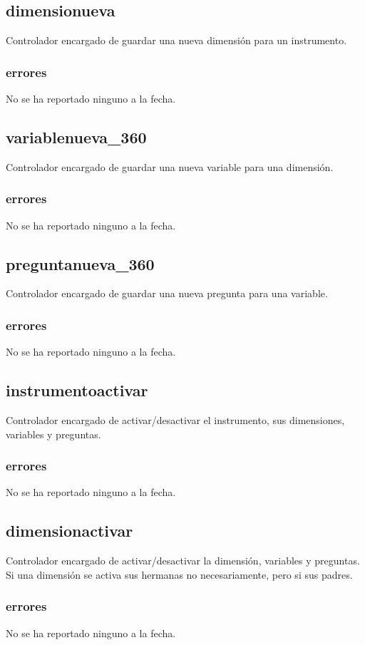 \documentclass[10pt,a4paper]{book}
\begin{document}
	\subsection{dimensionueva}
	Controlador encargado de guardar una nueva dimensión para un instrumento. 
	\subsubsection{errores}
	No se ha reportado ninguno a la fecha.
	
	\subsection{variablenueva\_360}
	Controlador encargado de guardar una nueva variable para una dimensión.
	\subsubsection{errores}
	No se ha reportado ninguno a la fecha.
	
	\subsection{preguntanueva\_360}
	Controlador encargado de guardar una nueva pregunta para una variable.
	\subsubsection{errores}
	No se ha reportado ninguno a la fecha.
	
	\subsection{instrumentoactivar}
	Controlador encargado de activar/desactivar el instrumento, sus dimensiones, variables y preguntas.
	\subsubsection{errores}
	No se ha reportado ninguno a la fecha.
	
	\subsection{dimensionactivar}
	Controlador encargado de activar/desactivar la dimensión, variables y preguntas. Si una dimensión se activa sus hermanas no necesariamente, pero si sus padres.
	\subsubsection{errores}
	No se ha reportado ninguno a la fecha.
	
\end{document}
